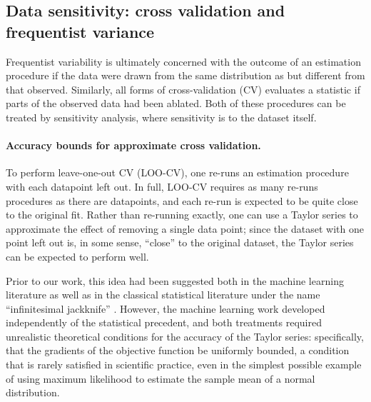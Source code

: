 

\subsection*{Data sensitivity: cross validation and frequentist variance}

Frequentist variability is ultimately concerned with the outcome of an
estimation procedure if the data were drawn from the same distribution as but
different from that observed.  Similarly, all forms of cross-validation (CV)
evaluates a statistic if parts of the observed data had been ablated.  Both of
these procedures can be treated by sensitivity analysis, where sensitivity
is to the dataset itself.

\paragraph{Accuracy bounds for approximate cross validation.}

To perform leave-one-out CV (LOO-CV), one re-runs an estimation procedure with
each datapoint left out.  In full, LOO-CV requires as many re-runs procedures as
there are datapoints, and each re-run is expected to be quite close to the
original fit.  Rather than re-running exactly, one can use a Taylor series to
approximate the effect of removing a single data point; since the dataset with
one point left out is, in some sense, ``close'' to the original dataset, the
Taylor series can be expected to perform well.

Prior to our work, this idea had been suggested both in the machine learning
literature \citep{rad:2018:scalableloo, koh:2017:blackbox} as well as in the
classical statistical literature under the name ``infinitesimal jackknife''
\citep{jaeckel:1972:infinitesimal, shao:2012:jackknife}.  However, the machine
learning work developed independently of the statistical precedent, and both
treatments required unrealistic theoretical conditions for the accuracy of the
Taylor series: specifically, that the gradients of the objective function be
uniformly bounded, a condition that is rarely satisfied in scientific practice,
even in the simplest possible example of using maximum likelihood to estimate
the sample mean of a normal distribution.

